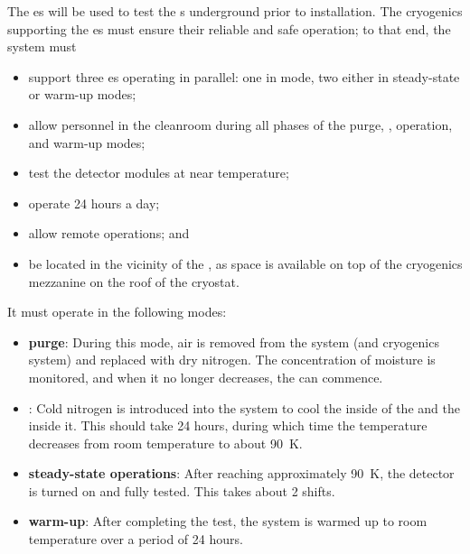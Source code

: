 \label{sec:fdsp-tc-cryocoldbox}


The  \coldbox{}es will be used to test the s underground prior to installation.  
The cryogenics supporting the \coldbox{}es  must ensure their reliable and safe operation; to that end, the system must
\begin{itemize}
\item support three \coldbox{}es operating in parallel: 
one in \cooldown mode, two either in steady-state or warm-up modes;
\item allow personnel in the cleanroom during all phases of the purge, \cooldown{}, operation, and warm-up modes; 
\item test the detector modules at near  temperature;
\item operate 24 hours a day;
\item allow remote operations; and 
\item be located in the vicinity of the , as space is available on top of the cryogenics mezzanine on the roof of the cryostat.
\end{itemize}

It must operate in the following modes: 

\begin{itemize}
\item \textbf{purge}: During this mode, air is removed from the system (\coldbox and cryogenics system) and replaced with dry nitrogen. The concentration of moisture is monitored, and when it no longer decreases, the \cooldown can commence.
\item \textbf{\cooldown}: Cold nitrogen is introduced into the system to cool the inside of the \coldbox and the  inside it. 
This should take 24 hours, during which time the temperature decreases from room temperature to about \SI{90}{K}. 
\item \textbf{steady-state operations}: After reaching approximately \SI{90}{K}, 
the detector is turned on and fully tested. 
This takes about 2 shifts.
\item \textbf{warm-up}: After completing the test, the system is
warmed up to room temperature over a period of 24 hours. 
\end{itemize}

